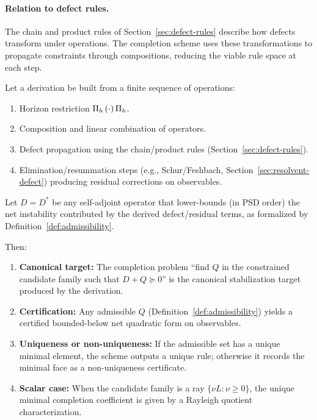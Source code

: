 \paragraph{Relation to defect rules.}
The chain and product rules of Section~\ref{sec:defect-rules} describe how defects transform under operations.
The completion scheme uses these transformations to propagate constraints
through compositions, reducing the viable rule space at each step.

\begin{theorem}
\label{thm:compiler-contract}
Let a derivation be built from a finite sequence of operations:
\begin{enumerate}[label=(\alph*), itemsep=0.1em]
\item Horizon restriction $\Pi_{h}\, (\cdot) \,\Pi_{h}$.
\item Composition and linear combination of operators.
\item Defect propagation using the chain/product rules (Section~\ref{sec:defect-rules}).
\item Elimination/resummation steps (e.g., Schur/Feshbach, Section~\ref{sec:resolvent-defect}) producing residual corrections on observables.
\end{enumerate}
Let $D = D^*$ be any self-adjoint operator that lower-bounds (in PSD order) the net instability contributed by the derived defect/residual terms, as formalized by Definition~\ref{def:admissibility}.

Then:
\begin{enumerate}[label=(\roman*), itemsep=0.2em]
\item \textbf{Canonical target:} The completion problem ``find $Q$ in the constrained candidate family such that $D + Q \succeq 0$'' is the canonical stabilization target produced by the derivation.
\item \textbf{Certification:} Any admissible $Q$ (Definition~\ref{def:admissibility}) yields a certified bounded-below net quadratic form on observables.
\item \textbf{Uniqueness or non-uniqueness:} If the admissible set has a unique minimal element, the scheme outputs a unique rule; otherwise it records the minimal face as a non-uniqueness certificate.
\item \textbf{Scalar case:} When the candidate family is a ray $\{\nu L : \nu \ge 0\}$, the unique minimal completion coefficient is given by a Rayleigh quotient characterization.
\end{enumerate}
\end{theorem}

